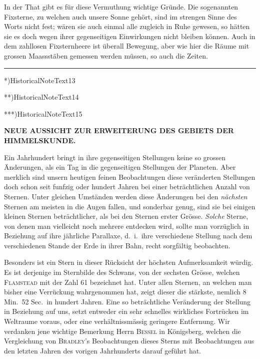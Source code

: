In der That gibt es für diese Vermuthung wichtige Gründe. Die sogenannten Fixsterne, zu welchen auch unsere Sonne gehört, sind im strengen Sinne des Worts nicht fest; wären sie auch einmal alle zugleich in Ruhe gewesen, so hätten sie es doch wegen ihrer gegenseitigen Einwirkungen nicht bleiben können. Auch in dem zahllosen Fixsternheere ist überall Bewegung, aber wie hier die Räume mit grossen Maassstäben gemessen werden müssen, so auch die Zeiten.
\par\nobreak\smallskip
\noindent\rule{.225\linewidth}{.3pt}\par\nobreak\smallskip
{\footnotesize
\indent\hypertarget{native-187-note-13}{}*)\enspace\csname HistoricalNoteText13\endcsname\par\nobreak
\indent\hypertarget{native-187-note-14}{}**)\enspace\csname HistoricalNoteText14\endcsname\par\nobreak
\indent\hypertarget{native-187-note-15}{}***)\enspace\csname HistoricalNoteText15\endcsname\par}
\par\clearpage
\thispagestyle{empty}
\noindent{}%
\makebox[10mm][l]{}%
\parbox[t]{\dimexpr\linewidth-20mm\relax}{\centering\fontsize{7}{8.5}\selectfont\bfseries NEUE AUSSICHT ZUR ERWEITERUNG DES GEBIETS DER HIMMELSKUNDE.\par}%
\par\nobreak\medskip
\noindent Ein Jahrhundert bringt in ihre gegenseitigen Stellungen keine so grossen Änderungen, als ein Tag in die gegenseitigen Stellungen der Planeten. Aber merklich sind unsern heutigen feinen Beobachtungen diese veränderten Stellungen doch schon seit funfzig oder hundert Jahren bei einer beträchtlichen Anzahl von Sternen. Unter gleichen Umständen werden diese Änderungen bei den \emph{nächsten} Sternen am meisten in die Augen fallen, und sonderbar genug, sind sie bei einigen kleinen Sternen beträchtlicher, als bei den Sternen erster Grösse. \emph{Solche} Sterne, von denen man vielleicht noch mehrere entdecken wird, sollte man vorzüglich in Beziehung auf ihre jährliche Parallaxe, d.\ i.\ ihre verschiedene Stellung nach dem verschiedenen Stande der Erde in ihrer Bahn, recht sorgfältig beobachten.

Besonders ist ein Stern in dieser Rücksicht der höchsten Aufmerksamkeit würdig. Es ist derjenige im Sternbilde des Schwans, von der sechsten Grösse, welchen \textsc{Flamstead} mit der Zahl 61 bezeichnet hat. Unter allen Sternen, an welchen man bisher eine Verrückung wahrgenommen hat, zeigt dieser die stärkste, nemlich 8 Min.\ 52 Sec.\ in hundert Jahren. Eine so beträchtliche Veränderung der Stellung in Beziehung auf uns, setzt entweder ein sehr schnelles wirkliches Fortrücken im Weltraume voraus, oder eine verhältnissmässig geringere Entfernung. Wir verdanken jene wichtige Bemerkung Herrn \textsc{Bessel} in Königsberg, welchen die Vergleichung von \textsc{Bradley}'s Beobachtungen dieses Sterns mit Beobachtungen aus den letzten Jahren des vorigen Jahrhunderts darauf geführt hat.

